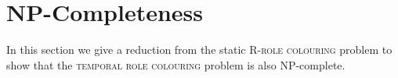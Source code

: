 \documentclass[runningheads]{llncs}
\begin{document}
\section{NP-Completeness}
 In this section we give a reduction from the static \textsc{R-role colouring} problem to show that the \textsc{temporal role colouring} problem is also NP-complete.

 
\end{document}
